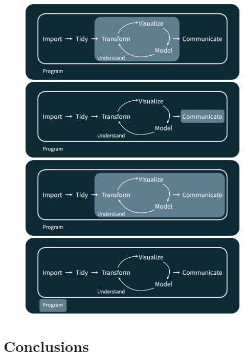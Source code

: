 \documentclass[11pt]{beamer}
\begin{document}
\begin{frame}
\begin{figure}
\begin{overprint}
		\centering\includegraphics[width=0.8\linewidth]{Images/S1/data-science-cycle/c6}
		\onslide<7>\centering\includegraphics[width=0.8\linewidth]{Images/S1/data-science-cycle/c7}
		\onslide<8>\centering\includegraphics[width=0.8\linewidth]{Images/S1/data-science-cycle/c8}
		\onslide<9>\centering\includegraphics[width=0.8\linewidth]{Images/S1/data-science-cycle/c9}	
		
	\end{overprint}
\end{figure}
		
	\end{frame}
	
	





		\section{Conclusions}
\end{document}
